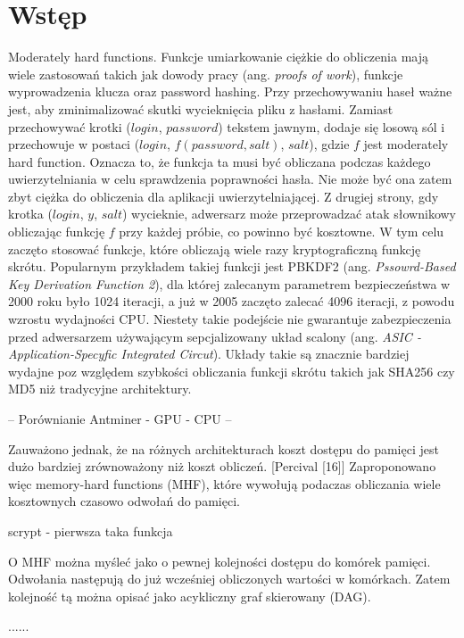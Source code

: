\chapter{Wstęp}
\thispagestyle{chapterBeginStyle}


Moderately hard functions. Funkcje umiarkowanie ciężkie do obliczenia mają wiele zastosowań takich jak dowody pracy (ang. \textit{proofs of work}), funkcje wyprowadzenia klucza oraz password hashing.
Przy przechowywaniu haseł ważne jest, aby zminimalizować skutki wycieknięcia pliku z hasłami.
Zamiast przechowywać krotki ($login$, $password$) tekstem jawnym, dodaje się losową sól i przechowuje w postaci ($login$, $f(password, salt)$, $salt$), gdzie $f$ jest moderately hard function.
Oznacza to, że funkcja ta musi być obliczana podczas każdego uwierzytelniania w celu sprawdzenia poprawności hasła. Nie może być ona zatem zbyt ciężka do obliczenia dla aplikacji uwierzytelniającej.
Z drugiej strony, gdy krotka ($login$, $y$, $salt$) wycieknie, adwersarz może przeprowadzać atak słownikowy obliczając funkcję $f$ przy każdej próbie, co powinno być kosztowne.
W tym celu zaczęto stosować funkcje, które obliczają wiele razy kryptograficzną funkcję skrótu. Popularnym przykładem takiej funkcji jest PBKDF2 (ang. \textit{Pssowrd-Based Key Derivation Function 2}), dla której zalecanym parametrem bezpieczeństwa w 2000 roku było 1024 iteracji, a już w 2005 zaczęto zalecać 4096 iteracji, z powodu wzrostu wydajności CPU.
Niestety takie podejście nie gwarantuje zabezpieczenia przed adwersarzem używającym sepcjalizowany układ scalony (ang. \textit{ASIC - Application-Specyfic Integrated Circut}).
Układy takie są znacznie bardziej wydajne poz względem szybkości obliczania funkcji skrótu takich jak SHA256 czy MD5 niż tradycyjne architektury.

-- Porównianie Antminer - GPU - CPU --

Zauważono jednak, że na różnych architekturach koszt dostępu do pamięci jest dużo bardziej zrównoważony niż koszt obliczeń. [Percival [16]]
Zaproponowano więc memory-hard functions (MHF), które wywołują podaczas obliczania wiele kosztownych czasowo odwołań do pamięci.

scrypt - pierwsza taka funkcja

O MHF można myśleć jako o pewnej kolejności dostępu do komórek pamięci. Odwołania następują do już wcześniej obliczonych wartości w komórkach.
Zatem kolejność tą można opisać jako acykliczny graf skierowany (DAG).

......



